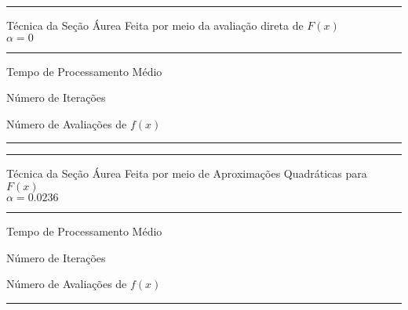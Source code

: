         \begin{minipage}[h!]{\linewidth}
            \centering
            \hrule
            \vspace{2mm}
            Técnica da Seção Áurea Feita por meio da avaliação direta de $F(x)$ \\ $\alpha=0$
            \vspace{2mm}
            \noindent
            \hrule 
            \vspace{2mm}
            Tempo de Processamento Médio\\
            \label{tab:tblCa} 
            \writetablestt{\tblCa}\par
            \bigskip
            \centering
            Número de Iterações\\
            \label{tab:tblCb} 
            \writetablestt{\tblCb}\par
            \bigskip
            \centering
            Número de Avaliações de $f(x)$\\
            \label{tab:tblCc} 
            \writetablestt{\tblCc}\par
            \vspace{2mm}
            \hrule
            \vspace{2mm}
        \end{minipage}

        \begin{minipage}[h!]{\linewidth}
            \centering
            \hrule
            \vspace{2mm}
            Técnica da Seção Áurea Feita por meio de Aproximações Quadráticas para $F(x)$ \\ $\alpha=0.0236$
            \vspace{2mm}
            \noindent
            \hrule 
            \vspace{2mm}
            Tempo de Processamento Médio\\
            \label{tab:tblDa} 
            \writetablestt{\tblDa}\par
            \bigskip
            \centering
            Número de Iterações\\
            \label{tab:tblDb} 
            \writetablestt{\tblDb}\par
            \bigskip
            \centering
            Número de Avaliações de $f(x)$\\
            \label{tab:tblDc} 
            \writetablestt{\tblDc}\par
            \vspace{2mm}
            \hrule
            \vspace{2mm}
        \end{minipage}

\newpage